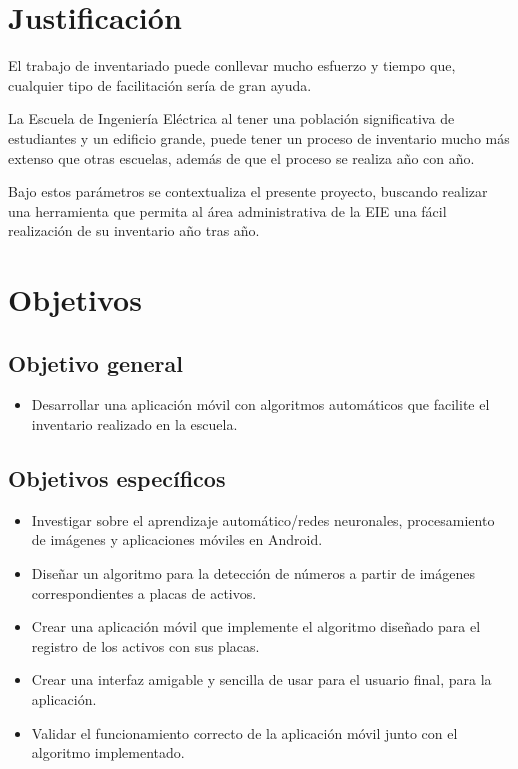 \section{Justificación}
El trabajo de inventariado puede conllevar mucho esfuerzo y tiempo que, cualquier tipo de facilitación sería de gran ayuda. 
\par
La Escuela de Ingeniería Eléctrica al tener una población significativa de estudiantes y un edificio grande, puede tener un proceso de inventario mucho más extenso que otras escuelas, además de que el proceso se realiza año con año.
\par
Bajo estos parámetros se contextualiza el presente proyecto, buscando realizar una herramienta que permita al área administrativa de la EIE una fácil realización de su inventario año tras año. 

\section{Objetivos}
\subsection{Objetivo general}
\begin{itemize}
    \item Desarrollar una aplicación móvil con algoritmos automáticos que facilite el inventario realizado en la escuela.
\end{itemize}
\subsection{Objetivos específicos}
\begin{itemize}
    \item Investigar sobre el aprendizaje automático/redes neuronales, procesamiento de imágenes y aplicaciones móviles en Android.
    \item Diseñar un algoritmo para la detección de números a partir de imágenes correspondientes a placas de activos.
    \item Crear una aplicación móvil que implemente el algoritmo diseñado para el registro de los activos con sus placas.
    \item Crear una interfaz amigable y sencilla de usar para el usuario final, para la aplicación. 
    \item Validar el funcionamiento correcto de la aplicación móvil junto con el algoritmo implementado.
\end{itemize}

